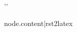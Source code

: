 \documentclass{article}
\begin{document}
\begin{center}
{{ '{' }}\LARGE {}} \par
\end{center}

\vspace{0.5cm}
 
{{ node.content|rst2latex }}
\end{document}
